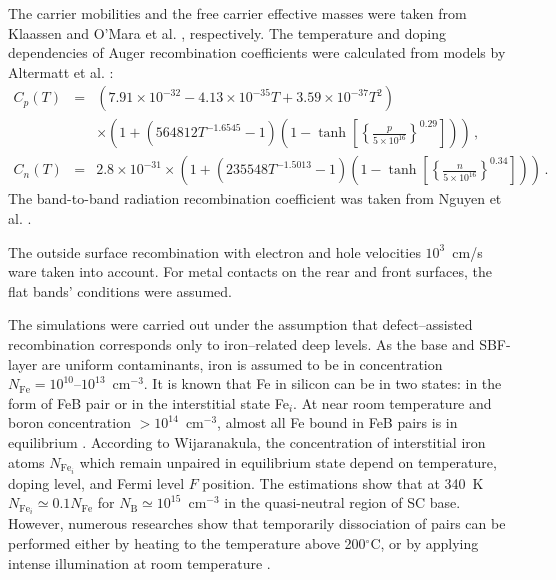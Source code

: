 \documentclass[num-refs]{wiley-article} %
\begin{document}
The carrier mobilities and the free carrier effective masses  were taken from Klaassen \cite{KLAASSEN953}
and O'Mara et al. \cite{OMara}, respectively.
The temperature and doping dependencies of Auger recombination coefficients were calculated from models by Altermatt et al. \cite{Si_Auger}:
\begin{eqnarray}
   \nonumber C_{p} (T)&=& (7.91\times10^{-32}-4.13\times10^{-35}T+3.59\times10^{-37}T^2)\\
  &&\times\left(1+\left(564812T^{-1.6545}-1\right)\left(1-\tanh\left[\left\{\frac{p}{5\times10^{16}}\right\}^{0.29}\right]\right)\right)\,, \\
   C_{n} (T)&=& 2.8\times10^{-31}
  \times\left(1+\left(235548T^{-1.5013}-1\right)\left(1-\tanh\left[\left\{\frac{n}{5\times10^{16}}\right\}^{0.34}\right]\right)\right)\,.
\end{eqnarray}
The band-to-band radiation recombination coefficient was taken from Nguyen et al. \cite{Si_BtB}.

The outside surface recombination with electron and hole velocities $10^3$~cm/s ware taken into account.
For metal contacts on the rear and front surfaces,
the flat bands' conditions were assumed.


The simulations were carried out under the assumption that defect–assisted recombination corresponds only to iron–related deep levels.
As the base and SBF-layer are uniform contaminants, iron is assumed to be in concentration
$N_{\mathrm{Fe}}=10^{10}$--$10^{13}$~cm$^{-3}$.
It is known that Fe in silicon can be in two states:
in the form of FeB pair or in the interstitial state Fe$_i$.
At near room temperature and boron concentration $>10^{14}$~cm$^{-3}$,
almost all Fe bound in FeB pairs is in equilibrium \cite{FeB:kinetic,FeBAssJAP2014,FeBAssSST2011,FeBJAP2005}.
According to Wijaranakula\cite{FeB:kinetic},
the concentration of interstitial iron atoms $N_{\mathrm{Fe}_i}$ which
remain unpaired in equilibrium state depend on temperature, doping level,
and Fermi level $F$ position.
The estimations show that at 340~K  $N_{\mathrm{Fe}_i}\simeq0.1 N_\mathrm{Fe}$
for $N_\mathrm{B}\simeq10^{15}$~cm$^{-3}$ in the quasi-neutral
region of SC base.
However, numerous researches show that temporarily dissociation of pairs can be performed either
by heating to the temperature above 200$^\circ$C,
or by applying intense illumination at room temperature \cite{FeBAssJAP2014,FeBJAP2005}.
\end{document}

